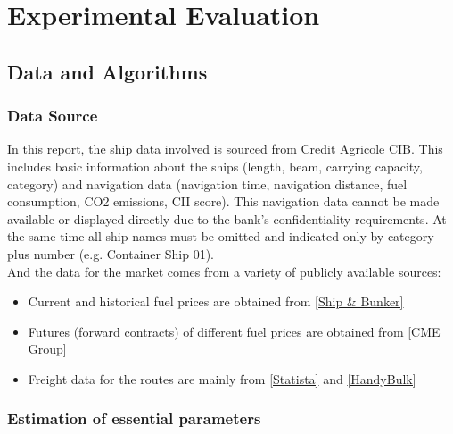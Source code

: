 \documentclass[a4paper,12pt]{article}
\begin{document}
\section{Experimental Evaluation}

\subsection{Data and Algorithms}

\subsubsection{Data Source}
In this report, the ship data involved is sourced from Credit Agricole CIB. This includes basic information about the ships (length, beam, carrying capacity, category) and navigation data (navigation time, navigation distance, fuel consumption, CO2 emissions, CII score).
This navigation data cannot be made available or displayed directly due to the bank's confidentiality requirements.
At the same time all ship names must be omitted and indicated only by category plus number (e.g. Container Ship 01).\\


And the data for the market comes from a variety of publicly available sources:
\begin{itemize}
	\item Current and historical fuel prices are obtained from \href{https://shipandbunker.com/prices}{[Ship \& Bunker]}
	\item Futures (forward contracts) of different fuel prices are obtained from \href{https://www.cmegroup.com/markets/energy/refined-products/mini-european-fob-rdam-marine-fuel-05-barges-platts.html}{[CME Group]}
	\item Freight data for the routes are mainly from \href{https://www.statista.com/statistics/1313360/container-freight-index-shanghai-rotterdam}{[Statista]} and \href{https://www.handybulk.com/ship-charter-rates/}{[HandyBulk]}
\end{itemize}

\subsubsection{Estimation of essential parameters}

\end{document}
